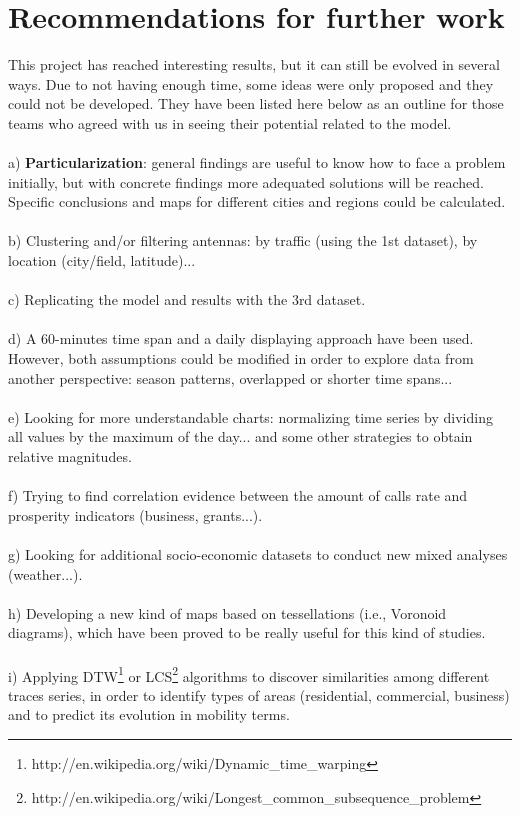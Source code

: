 \newpage
\section{Recommendations for further work}

This project has reached interesting results, but it can still be evolved in several ways. Due to not having enough time, some ideas were only proposed and they could not be developed. They have been listed here below as an outline for those teams who agreed with us in seeing their potential related to the model.
\\
\\
a) {\bf Particularization}: general findings are useful to know how to face a problem initially, but with concrete findings more adequated solutions will be reached. Specific conclusions and maps for different cities and regions could be calculated.
\\
\\
b) Clustering and/or filtering antennas: by traffic (using the 1st dataset), by location (city/field, latitude)...
\\
\\
c) Replicating the model and results with the 3rd dataset.
\\
\\
d) A 60-minutes time span and a daily displaying approach have been used. However, both assumptions could be modified in order to explore data from another perspective: season patterns, overlapped or shorter time spans...
\\
\\
e) Looking for more understandable charts: normalizing time series by dividing all values by the maximum of the day... and some other strategies to obtain relative magnitudes.
\\
\\
f) Trying to find correlation evidence between the amount of calls rate and prosperity indicators (business, grants...).
\\
\\
g) Looking for additional socio-economic datasets to conduct new mixed analyses (weather...).
\\
\\
h) Developing a new kind of maps based on tessellations (i.e., Voronoid diagrams), which have been proved to be really useful for this kind of studies.
\\
\\
i) Applying DTW\footnote{http://en.wikipedia.org/wiki/Dynamic_time_warping} or LCS\footnote{http://en.wikipedia.org/wiki/Longest_common_subsequence_problem} algorithms to discover similarities among different traces series, in order to identify types of areas (residential, commercial, business) and to predict its evolution in mobility terms.
